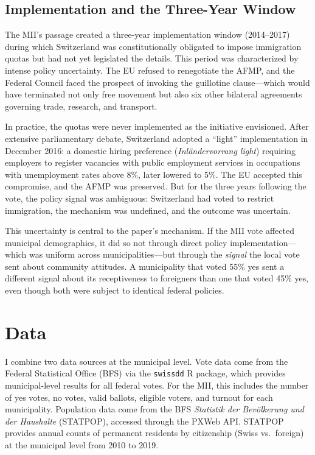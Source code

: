 \documentclass[12pt]{article}
\begin{document}
\subsection{Implementation and the Three-Year Window}

The MII's passage created a three-year implementation window (2014--2017) during which Switzerland was constitutionally obligated to impose immigration quotas but had not yet legislated the details. This period was characterized by intense policy uncertainty. The EU refused to renegotiate the AFMP, and the Federal Council faced the prospect of invoking the guillotine clause---which would have terminated not only free movement but also six other bilateral agreements governing trade, research, and transport.

In practice, the quotas were never implemented as the initiative envisioned. After extensive parliamentary debate, Switzerland adopted a ``light'' implementation in December 2016: a domestic hiring preference (\textit{Inl\"andervorrang light}) requiring employers to register vacancies with public employment services in occupations with unemployment rates above 8\%, later lowered to 5\%. The EU accepted this compromise, and the AFMP was preserved. But for the three years following the vote, the policy signal was ambiguous: Switzerland had voted to restrict immigration, the mechanism was undefined, and the outcome was uncertain.

This uncertainty is central to the paper's mechanism. If the MII vote affected municipal demographics, it did so not through direct policy implementation---which was uniform across municipalities---but through the \textit{signal} the local vote sent about community attitudes. A municipality that voted 55\% yes sent a different signal about its receptiveness to foreigners than one that voted 45\% yes, even though both were subject to identical federal policies.


\section{Data}

I combine two data sources at the municipal level. Vote data come from the Federal Statistical Office (BFS) via the \texttt{swissdd} R package, which provides municipal-level results for all federal votes. For the MII, this includes the number of yes votes, no votes, valid ballots, eligible voters, and turnout for each municipality. Population data come from the BFS \textit{Statistik der Bev\"olkerung und der Haushalte} (STATPOP), accessed through the PXWeb API. STATPOP provides annual counts of permanent residents by citizenship (Swiss vs.\ foreign) at the municipal level from 2010 to 2019.
\end{document}
